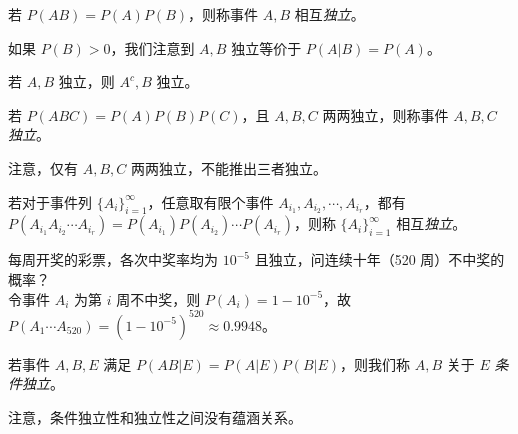 \documentclass[../main.tex]{subfiles}
\begin{document}
\begin{definition}\label{def:1.7.1}
    若 $P(AB)=P(A)P(B)$，则称事件 $A,B$ 相互\emph{独立}。
\end{definition}

如果 $P(B)>0$，我们注意到 $A,B$ 独立等价于 $P(A|B)=P(A)$。

\begin{proposition}
    若 $A,B$ 独立，则 $A^c,B$ 独立。
\end{proposition}

\begin{definition}\label{def:1.7.2}
    若 $P(ABC)=P(A)P(B)P(C)$，且 $A,B,C$ 两两独立，则称事件 $A,B,C$ \emph{独立}。
\end{definition}

注意，仅有 $A,B,C$ 两两独立，不能推出三者独立。

\begin{definition}\label{def:1.7.3}
    若对于事件列 $\{A_i\}_{i=1}^\infty$，任意取有限个事件 $A_{i_1},A_{i_2},\cdots,A_{i_r}$，都有 $P(A_{i_1}A_{i_2}\cdots A_{i_r})=P(A_{i_1})P(A_{i_2})\cdots P(A_{i_r})$，则称 $\{A_i\}_{i=1}^\infty$ 相互\emph{独立}。
\end{definition}

\begin{example}
    每周开奖的彩票，各次中奖率均为 $10^{-5}$ 且独立，问连续十年（520 周）不中奖的概率？\\
    令事件 $A_i$ 为第 $i$ 周不中奖，则 $P(A_i)=1-10^{-5}$，故 $P(A_1\cdots A_{520})=(1-10^{-5})^{520}\approx 0.9948$。
\end{example}

\begin{definition}\label{def:1.7.4}
    若事件 $A,B,E$ 满足 $P(AB|E)=P(A|E)P(B|E)$，则我们称 $A,B$ 关于 $E$ \emph{条件独立}。
\end{definition}

注意，条件独立性和独立性之间没有蕴涵关系。
\end{document}
